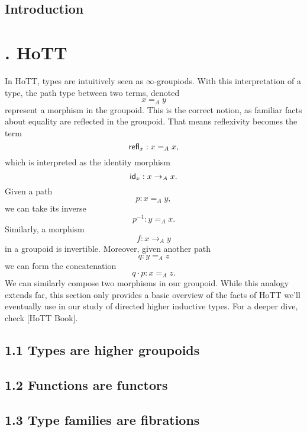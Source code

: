 \documentclass{article}
\theoremstyle{named}
\theoremstyle{remark}
\theoremstyle{definition}
\begin{document}
\newpage 
\subsection*{\centering Introduction}

\newpage
\section*{. HoTT}
In HoTT, types are intuitively seen as $\infty$-groupiods. With this interpretation of a type, the path type between two terms, denoted $$x =_A y$$ represent a morphism in the groupoid. This is the correct notion, as familiar facts about equality are
reflected in the groupoid. That means reflexivity becomes the term $$\mathsf{refl}_{x} : x=_A x,$$ which is interpreted as the identity morphism $$\mathsf{id}_{x} : x \to_A x.$$ Given a path $$p : x =_A y,$$ we can take its inverse $$p^{-1} : y =_A x.$$ Similarly, a morphism $$f : x \to_A y$$ in a groupoid is invertible. Moreover, given another path $$q : y =_A z$$ we can form the concatenation $$q \cdot p : x =_A z.$$ We can similarly compose two morphisms in our groupoid. While this analogy extends far, this section only provides a basic overview of the facts of HoTT we'll eventually use in our study of directed higher inductive types. For a deeper dive, check [HoTT Book]. 

\setcounter{section}{1}

\subsection*{1.1 Types are higher groupoids}


\subsection*{1.2 Functions are functors}


\subsection*{1.3 Type families are fibrations}

\end{document}
